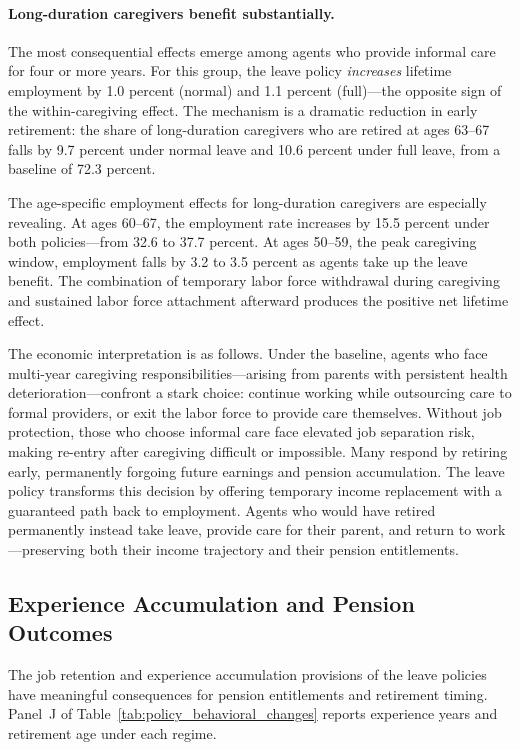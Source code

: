 \paragraph{Long-duration caregivers benefit substantially.} The most consequential effects emerge among agents who provide informal care for four or more years. For this group, the leave policy \textit{increases} lifetime employment by 1.0 percent (normal) and 1.1 percent (full)---the opposite sign of the within-caregiving effect. The mechanism is a dramatic reduction in early retirement: the share of long-duration caregivers who are retired at ages 63--67 falls by 9.7 percent under normal leave and 10.6 percent under full leave, from a baseline of 72.3 percent.

The age-specific employment effects for long-duration caregivers are especially revealing. At ages 60--67, the employment rate increases by 15.5 percent under both policies---from 32.6 to 37.7 percent. At ages 50--59, the peak caregiving window, employment falls by 3.2 to 3.5 percent as agents take up the leave benefit. The combination of temporary labor force withdrawal during caregiving and sustained labor force attachment afterward produces the positive net lifetime effect.

The economic interpretation is as follows. Under the baseline, agents who face multi-year caregiving responsibilities---arising from parents with persistent health deterioration---confront a stark choice: continue working while outsourcing care to formal providers, or exit the labor force to provide care themselves. Without job protection, those who choose informal care face elevated job separation risk, making re-entry after caregiving difficult or impossible. Many respond by retiring early, permanently forgoing future earnings and pension accumulation. The leave policy transforms this decision by offering temporary income replacement with a guaranteed path back to employment. Agents who would have retired permanently instead take leave, provide care for their parent, and return to work---preserving both their income trajectory and their pension entitlements.


\subsection{Experience Accumulation and Pension Outcomes}\label{subsec:pensions}

The job retention and experience accumulation provisions of the leave policies have meaningful consequences for pension entitlements and retirement timing. Panel~J of Table~\ref{tab:policy_behavioral_changes} reports experience years and retirement age under each regime.

